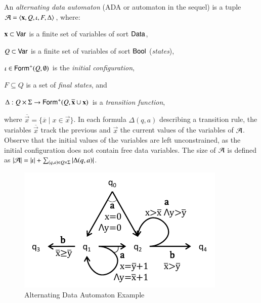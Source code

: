 \documentclass[10pt,conference,letterpaper,twocolumn]{IEEEtran}
\begin{document}
An \emph{alternating data automaton} (ADA or automaton in the sequel)
is a tuple $\mathcal{A} = \left\langle \mathbf x,Q,\iota,F,\Delta \right\rangle$,
where: \begin{compactitem}
%
\item $\mathbf x \subset \mathsf{Var}$ is a finite set of variables of sort
  $\mathsf{Data}$,
%
\item $Q \subset \mathsf{Var}$ is a finite set of variables of sort $\mathsf{Bool}$
  (\emph{states}),
%
\item $\iota \in \mathsf{Form}^+(Q,\emptyset)$ is the \emph{initial
  configuration},
%
\item $F \subseteq Q$ is a set of \emph{final states}, and
%
\item $\Delta : Q \times \Sigma \rightarrow
  \mathsf{Form}^+(Q,\overline{\mathbf x}\cup\mathbf x)$ is a \emph{transition
    function},
\end{compactitem}
where $\overline{\vec{x}}=\{\overline{x} \mid x \in \vec{x}\}$. In
each formula $\Delta(q,a)$ describing a transition rule, the variables
$\overline{\vec{x}}$ track the previous and $\vec{x}$ the current
values of the variables of $\mathcal{A}$. Observe that the initial values of
the variables are left unconstrained, as the initial configuration
does not contain free data variables. The size of $\mathcal{A}$ is defined as
${|{\mathcal{A}}|} = {|{\iota}|} + \sum_{(q,a) \in
  Q\times\Sigma}{|{\Delta(q,a)}|}$.

\begin{figure}[htb]
\vspace*{-\baselineskip}
\centerline{\includegraphics[scale=0.8]{figures/Example.pdf}}
\vspace*{-\baselineskip}
\caption{Alternating Data Automaton Example}
\label{fig:ex}
\end{figure}
\end{document}
